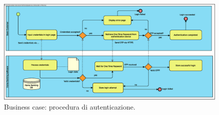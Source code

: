 \documentclass[10pt]{softeng} %
\begin{document}


\printcustombibsmall{}



\begin{figure}[hbt]
	\centering
	\includegraphics[width=\textheight, angle=90]{Images/Authentication.eps}
	\caption{Business case: procedura di autenticazione.}
	\label{fig:business_case_authentication}
\end{figure}
\end{document}

